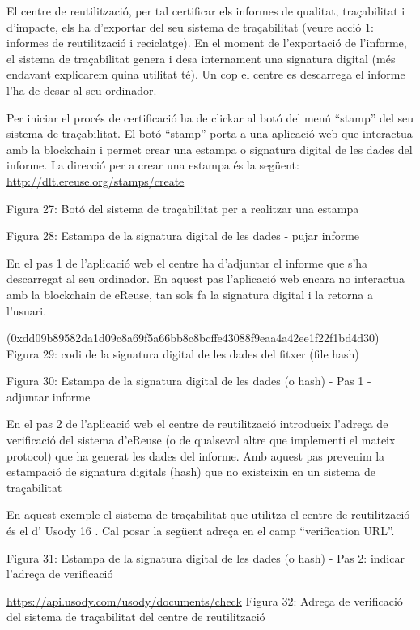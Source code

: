 \documentclass[
]{book}
\begin{document}
El centre de reutilització, per tal certificar els informes de qualitat, traçabilitat i d'impacte, els ha d'exportar del seu sistema de traçabilitat (veure acció 1: informes de reutilització i reciclatge). En el moment de l'exportació de l'informe, el sistema de traçabilitat genera i desa internament una signatura digital (més endavant explicarem quina utilitat té). Un cop el centre es descarrega el informe l'ha de desar al seu ordinador.

Per iniciar el procés de certificació ha de clickar al botó del menú ``stamp'' del seu sistema de traçabilitat. El botó ``stamp'' porta a una aplicació web que interactua amb la blockchain i permet crear una estampa o signatura digital de les dades del informe. La direcció per a crear una estampa és la següent: \url{http://dlt.ereuse.org/stamps/create}

Figura 27: Botó del sistema de traçabilitat per a realitzar una estampa

Figura 28: Estampa de la signatura digital de les dades - pujar informe

En el pas 1 de l'aplicació web el centre ha d'adjuntar el informe que s'ha descarregat al seu ordinador. En aquest pas l'aplicació web encara no interactua amb la blockchain de eReuse, tan sols fa la signatura digital i la retorna a l'usuari.

(0xdd09b89582da1d09c8a69f5a66bb8c8bcffe43088f9eaa4a42ee1f22f1bd4d30)
Figura 29: codi de la signatura digital de les dades del fitxer (file hash)

Figura 30: Estampa de la signatura digital de les dades (o hash) - Pas 1 - adjuntar informe

En el pas 2 de l'aplicació web el centre de reutilització introdueix l'adreça de verificació del
sistema d'eReuse (o de qualsevol altre que implementi el mateix protocol) que ha generat les dades del informe. Amb aquest pas prevenim la estampació de signatura digitals (hash) que no existeixin en un sistema de traçabilitat

En aquest exemple el sistema de traçabilitat que utilitza el centre de reutilització és el d'
Usody 16 . Cal posar la següent adreça en el camp ``verification URL''.

Figura 31: Estampa de la signatura digital de les dades
(o hash) - Pas 2: indicar l'adreça de verificació

\url{https://api.usody.com/usody/documents/check}
Figura 32: Adreça de verificació del sistema de traçabilitat del centre
de reutilització
\end{document}
